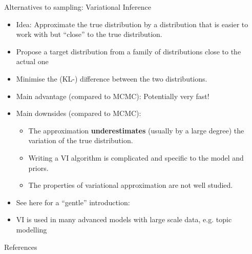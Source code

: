 \documentclass[10pt,handout]{beamer}
\begin{document}
\begin{frame}[t]{Alternatives to sampling: Variational Inference}

  \begin{itemize}
    \item Idea: Approximate the true distribution by a distribution that is easier to work with but \enquote{close} to the true distribution.
    \item Propose a target distribution from a family of distributions close to the actual one
    \item Minimise the (KL-) difference between the two distributions.
    \item Main advantage (compared to MCMC): Potentially very fast!
    \item Main downsides (compared to MCMC):
      \begin{itemize}
        \item The approximation \textbf{underestimates} (usually by a large degree) the variation of the true distribution.
        \item Writing a VI algorithm is complicated and specific to the model and priors.
        \item The properties of variational approximation are not well studied.
      \end{itemize}
    \item See here for a \enquote{gentle} introduction: \textcite{BKM2017}
    \item VI is used in many advanced models with large scale data, e.g. topic modelling
  \end{itemize}

\end{frame}




\begin{frame}[t]{References}
  \tiny
  \printbibliography
\end{frame}


\end{document}
